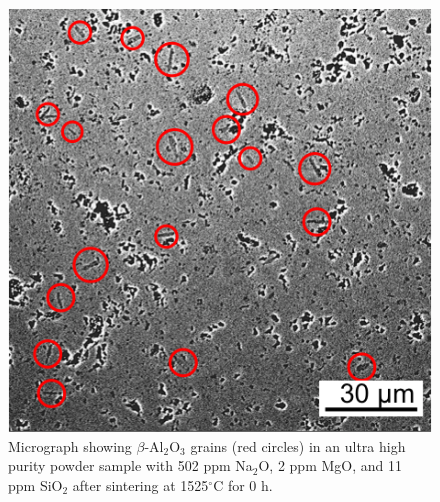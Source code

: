 \newpage
\begin{figure}[H]
	\centering
	\includegraphics[width=\textwidth]{Chapter-5/Figures/Figure10.png}
	\caption{Micrograph showing $\beta$-Al$_{2}$O$_{3}$ grains (red circles) in an ultra high purity powder sample with 502 ppm Na$_{2}$O, 2 ppm MgO, and 11 ppm SiO$_{2}$ after sintering at 1525$^{\circ}$C for 0 h.}
	\label{Ch5-figure:Figure10}
\end{figure}


